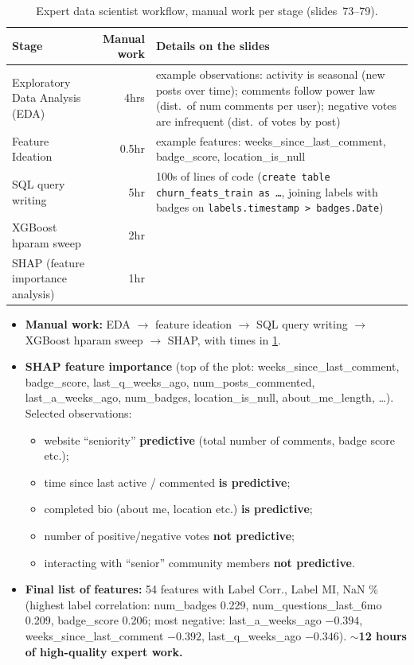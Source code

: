 \begin{table}[htbp]
  \centering\small
  \caption{Expert data scientist workflow, manual work per stage (slides~73--79).}
  \label{tab:lec12-workflow}
  \begin{tabularx}{\linewidth}{@{}>{\raggedright\arraybackslash}p{3.7cm}r>{\raggedright\arraybackslash}X@{}}
    \toprule
    Stage & Manual work & Details on the slides\\
    \midrule
    Exploratory Data Analysis (EDA) & 4hrs & example observations: activity is seasonal
      (new posts over time); comments follow power law (dist.\ of num comments per
      user); negative votes are infrequent (dist.\ of votes by post)\\
    Feature Ideation & 0.5hr & example features: weeks\_since\_last\_comment,
      badge\_score, location\_is\_null\\
    SQL query writing & 5hr & 100s of lines of code (\texttt{create table
      churn\_feats\_train as \dots}, joining labels with badges on
      \texttt{labels.timestamp > badges.Date})\\
    XGBoost hparam sweep & 2hr & \\
    SHAP (feature importance analysis) & 1hr & \\
    \bottomrule
  \end{tabularx}
\end{table}

\begin{itemize}
  \item \textbf{Manual work:} EDA $\to$ feature ideation $\to$ SQL query writing $\to$
    XGBoost hparam sweep $\to$ SHAP, with times in \cref{tab:lec12-workflow}.
  \item \textbf{SHAP feature importance} (top of the plot: weeks\_since\_last\_comment,
    badge\_score, last\_q\_weeks\_ago, num\_posts\_commented, last\_a\_weeks\_ago,
    num\_badges, location\_is\_null, about\_me\_length, \dots). Selected observations:
    \begin{itemize}
      \item website ``seniority'' \textbf{predictive} (total number of comments, badge
        score etc.);
      \item time since last active / commented \textbf{is predictive};
      \item completed bio (about me, location etc.) \textbf{is predictive};
      \item number of positive/negative votes \textbf{not predictive};
      \item interacting with ``senior'' community members \textbf{not predictive}.
    \end{itemize}
  \item \textbf{Final list of features:} 54 features with Label Corr., Label MI, NaN \%
    (highest label correlation: num\_badges 0.229, num\_questions\_last\_6mo 0.209,
    badge\_score 0.206; most negative: last\_a\_weeks\_ago $-0.394$,
    weeks\_since\_last\_comment $-0.392$, last\_q\_weeks\_ago $-0.346$).
    \textbf{$\sim$12 hours of high-quality expert work.}
\end{itemize}

